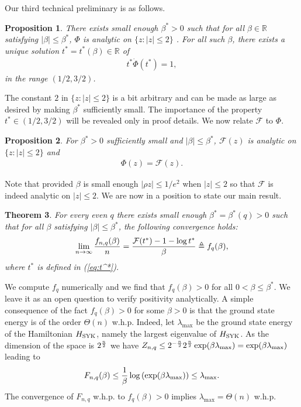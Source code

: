 \documentclass[12pt]{article}
\newtheorem{theorem}{Theorem}
\newtheorem{proposition}[theorem]{Proposition}
\newcommand{\R}{\mathbb{R}}
\newcommand{\cF}{\mathcal{F}}
\begin{document}
Our third  technical preliminary is as follows.
\begin{proposition}\label{prop:t-star}
There exists small enough $\beta^*>0$ such that for all $\beta\in \R$ satisfying $|\beta|\le \beta^*$, $\Phi$ is analytic on $\{z: |z|\le 2\}$ .
For all such $\beta$, there exists a unique solution $t^*=t^*(\beta)\in \R$ of 
\begin{align}\label{eq:t^*}
t^* \dot\Phi(t^*) = 1,
\end{align}
in the range  $(1/2,3/2)$.
\end{proposition}
The constant $2$ in $\{z: |z|\le 2\}$ is a bit arbitrary and can be made as large as desired by making $\beta^*$ sufficiently small.
The importance of the property $t^*\in (1/2,3/2)$ will be revealed only in  proof details.  
We now relate $\mathcal{F}$ to $\Phi$. 
\begin{proposition}\label{prop:t-star-2}
For $\beta^*>0$ sufficiently small and $|\beta|\le \beta^*$, $\cF(z)$ is analytic on $\{z: |z| \le 2\}$ and 
\begin{align}
\Phi(z) = \mathcal{F}(z). \label{eq:Phi-is-mathcalF}
\end{align}
\end{proposition}
Note that provided $\beta$ is small enough $|\rho z|\le 1/e^2$ when $|z|\le 2$ so that $\cF$ is indeed analytic on $|z|\le 2$.
We are now in a position to state our main result.

\begin{theorem}\label{theorem:main-result}
For every even $q$ there exists small enough $\beta^*=\beta^*(q)>0$ such that for all $\beta$ satisfying $|\beta |\le \beta^*$, 
the following convergence holds:
\begin{align}
\lim_{n\to\infty} \frac{f_{n,q}(\beta)}{n}={\cF(t^*) -1 - \log t^* \over \beta} \triangleq f_q(\beta), \label{eq:main-result}
\end{align}
where $t^*$ is defined in (\ref{eq:t^*}).
\end{theorem}
We compute $f_q$ numerically and we find that $f_q(\beta)>0$ for all $0<\beta\le \beta^*$. We leave
it as an open question to verify positivity analytically.
A simple consequence of the fact $f_q(\beta)>0$ for some $\beta>0$ is that the ground state energy is of the order $\Theta(n)$ w.h.p. 
Indeed, let $\lambda_{\max}$ be the ground state energy of the Hamiltonian $H_{\rm SYK}$, namely the largest eigenvalue of $H_{\rm SYK}$. As the 
dimension of the space is $2^{n\over 2}$ we have
$Z_{n,q}\le 2^{-{n\over 2}} 2^{n\over 2}\exp(\beta \lambda_{\max})=\exp(\beta\lambda_{\max})$ leading to
\begin{align*}
F_{n,q}(\beta)\le {1\over\beta}\log\left(\exp(\beta\lambda_{\max})\right)\le \lambda_{\max}.
\end{align*}
The convergence of $F_{n,q}$ w.h.p. to $f_q(\beta)>0$ implies $\lambda_{\max}=\Theta(n)$ w.h.p.
\end{document}
